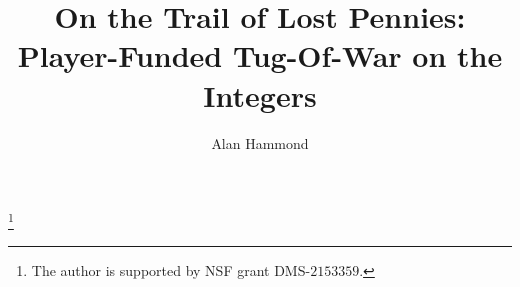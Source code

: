 \documentclass[letterpaper,11pt,oneside,reqno]{amsbook}
\numberwithin{figure}{chapter}
\theoremstyle{definition}
\theoremstyle{definition}
\theoremstyle{definition}
\theoremstyle{definition}
\theoremstyle{definition}
\begin{document}
\title[The Trail of Lost Pennies]{On the Trail of Lost Pennies: \\
 Player-Funded Tug-Of-War on the Integers}




\author[A. Hammond]{Alan Hammond}
\address{A. Hammond\\
  Department of Mathematics and Statistics\\
 U.C. Berkeley \\
  899 Evans Hall \\
  Berkeley, CA, 94720-3840 \\
  U.S.A.}
  \thanks{The author is supported by NSF grant DMS-$2153359$. }
\end{document}
